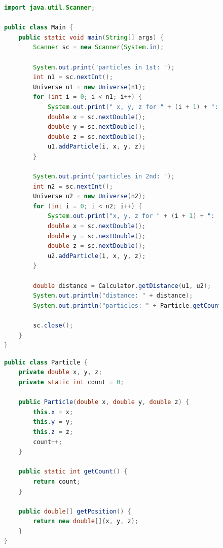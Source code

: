 \documentclass[a4paper, 14pt]{extarticle}
\begin{document}
\begin{figure}[!htb]
\begin{lstlisting}[language={java},caption={Файл Main.java},label={lst:code1}]
import java.util.Scanner;

public class Main {
    public static void main(String[] args) {
        Scanner sc = new Scanner(System.in);

        System.out.print("particles in 1st: ");
        int n1 = sc.nextInt();
        Universe u1 = new Universe(n1);
        for (int i = 0; i < n1; i++) {
            System.out.print(" x, y, z for " + (i + 1) + ": ");
            double x = sc.nextDouble();
            double y = sc.nextDouble();
            double z = sc.nextDouble();
            u1.addParticle(i, x, y, z);
        }

        System.out.print("particles in 2nd: ");
        int n2 = sc.nextInt();
        Universe u2 = new Universe(n2);
        for (int i = 0; i < n2; i++) {
            System.out.print("x, y, z for " + (i + 1) + ": ");
            double x = sc.nextDouble();
            double y = sc.nextDouble();
            double z = sc.nextDouble();
            u2.addParticle(i, x, y, z);
        }

        double distance = Calculator.getDistance(u1, u2);
        System.out.println("distance: " + distance);
        System.out.println("particles: " + Particle.getCount());

        sc.close();
    }
}
\end{lstlisting}
\end{figure}

\begin{figure}[!htb]
\begin{lstlisting}[language={java},caption={Файл Particle.java},label={lst:code2}]
public class Particle {
    private double x, y, z;
    private static int count = 0;

    public Particle(double x, double y, double z) {
        this.x = x;
        this.y = y;
        this.z = z;
        count++;
    }

    public static int getCount() {
        return count;
    }

    public double[] getPosition() {
        return new double[]{x, y, z};
    }
}

\end{lstlisting}
\end{figure}
\end{document}
